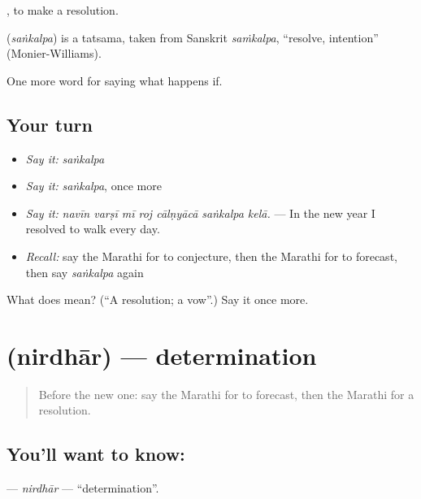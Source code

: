  , to make a resolution.

\begin{cousinweb}
\textbf{} (\emph{saṅkalpa}) is a tatsama, taken from Sanskrit \emph{saṁkalpa}, \textquotedblleft{}resolve, intention\textquotedblright{} (Monier-Williams).
\end{cousinweb}

\begin{grammarlens}[title={What you've built}]
One more word for saying what happens if.
\end{grammarlens}

\subsection*{Your turn}
\begin{itemize}
\raggedright
  \item \emph{Say it:} \emph{saṅkalpa}
  \item \emph{Say it:} \emph{saṅkalpa}, once more
  \item \emph{Say it:} \emph{navīn varṣī mī roj cālṇyācā saṅkalpa kelā.} — In the new year I resolved to walk every day.
  \item \emph{Recall:} say the Marathi for to conjecture, then the Marathi for to forecast, then say \emph{saṅkalpa} again
\end{itemize}

\begin{tcolorbox}[breakable,colback=teal!4,colframe=teal!35!black,title={Before you move on}]
What does  mean? (\textquotedblleft{}A resolution; a vow\textquotedblright{}.) Say it once more.
\end{tcolorbox}
\section[\texorpdfstring{\mr{निर्धार} (nirdhār)}{निर्धार (nirdhār)}]{ (nirdhār) — determination}

\label{lesson:MR-C546-nirdhar}



\begin{quote}
Before the new one: say the Marathi for to forecast, then the Marathi for a resolution.
\end{quote}

\subsection*{You'll want to know: }
\textbf{} — \emph{nirdhār} — \textquotedblleft{}determination\textquotedblright{}.

